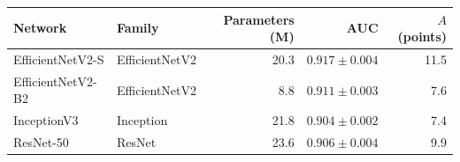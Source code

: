 \begin{tabular}{llrrr}
\toprule
Network & Family & Parameters (M) & AUC & $A$ (points) \\
\midrule
EfficientNetV2-S & EfficientNetV2 & 20.3 & $0.917\pm0.004$ & 11.5 \\
EfficientNetV2-B2 & EfficientNetV2 & 8.8 & $0.911\pm0.003$ & 7.6 \\
InceptionV3 & Inception & 21.8 & $0.904\pm0.002$ & 7.4 \\
ResNet-50 & ResNet & 23.6 & $0.906\pm0.004$ & 9.9 \\
\bottomrule
\end{tabular}
